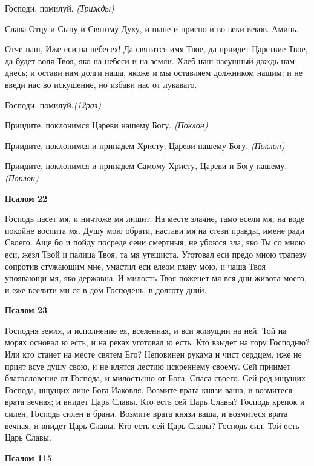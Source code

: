 Господи, помилуй. \itshape (Трижды)\normalfont{}


Слава Отцу и Сыну и Святому Духу, и ныне и присно и во веки веков. Аминь.


Отче наш, Иже еси на небесех! Да святится имя Твое, да приидет Царствие Твое, да будет воля Твоя, яко на небеси и на земли. Хлеб наш насущный даждь нам днесь; и остави нам долги наша, якоже и мы оставляем должником нашим; и не введи нас во искушение, но избави нас от лукаваго.


Господи, помилуй.\itshape  (12раз)\normalfont{}


Приидите, поклонимся Цареви нашему Богу. \itshape (Поклон)\normalfont{}


Приидите, поклонимся и припадем Христу, Цареви нашему Богу. \itshape (Поклон)\normalfont{}


Приидите, поклонимся и припадем Самому Христу, Цареви и Богу нашему.\itshape (Поклон)\normalfont{}




\bfseries Псалом 22\normalfont{}


Господь пасет мя, и ничтоже мя лишит. На месте злачне, тамо всели мя, на воде покойне воспита мя. Душу мою обрати, настави мя на стези правды, имене ради Своего. Аще бо и пойду посреде сени смертныя, не убоюся зла, яко Ты со мною еси, жезл Твой и палица Твоя, та мя утешиста. Уготовал еси предо мною трапезу сопротив стужающим мне, умастил еси елеом главу мою, и чаша Твоя упоявающи мя, яко державна. И милость Твоя поженет мя вся дни живота моего, и еже вселити ми ся в дом Господень, в долготу дний.




\bfseries Псалом 23\normalfont{}


Господня земля, и исполнение ея, вселенная, и вси живущии на ней. Той на морях основал ю есть, и на реках уготовал ю есть. Кто взыдет на гору Господню? Или кто станет на месте святем Его? Неповинен рукама и чист сердцем, иже не прият всуе душу свою, и не клятся лестию искреннему своему. Сей приимет благословение от Господа, и милостыню от Бога, Спаса своего. Сей род ищущих Господа, ищущих лице Бога Иаковля. Возмите врата князи ваша, и возмитеся врата вечная; и внидет Царь Славы. Кто есть сей Царь Славы? Господь крепок и силен, Господь силен в брани. Возмите врата князи ваша, и возмитеся врата вечная, и внидет Царь Славы. Кто есть сей Царь Славы? Господь сил, Той есть Царь Славы.




\bfseries Псалом 115\normalfont{}



